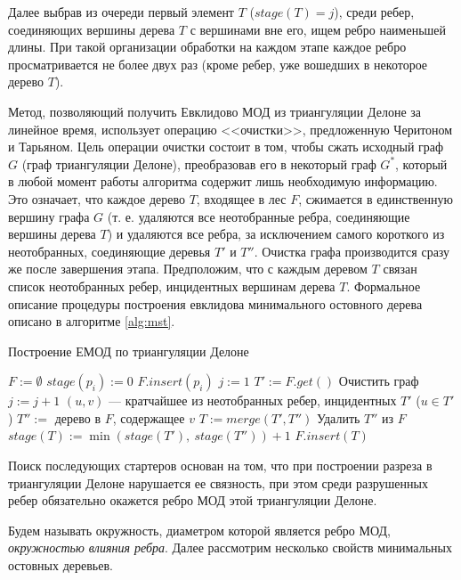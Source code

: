 \documentclass[12pt]{article}
\begin{document}
Далее выбрав из очереди первый элемент $T$ ($stage(T) = j$), среди ребер,
соединяющих вершины дерева $T$ с вершинами вне его, ищем ребро наименьшей длины.
При такой организации обработки на каждом этапе каждое ребро просматривается не более двух раз
(кроме ребер, уже вошедших в некоторое дерево $T$).

Метод, позволяющий получить Евклидово МОД из триангуляции Делоне за линейное время,
использует операцию <<очистки>>, предложенную Черитоном и Тарьяном.
Цель операции очистки состоит в том, чтобы сжать исходный граф $G$ (граф триангуляции Делоне),
преобразовав его в некоторый граф $G^*$, который в любой момент работы алгоритма содержит лишь необходимую информацию.
Это означает, что каждое дерево $T$, входящее в лес $F$, сжимается в единственную вершину графа $G$
(т. е. удаляются все неотобранные ребра, соединяющие вершины дерева $T$) и
удаляются все ребра, за исключением самого короткого из неотобранных, соединяющие деревья $T'$ и $T''$.
Очистка графа производится сразу же после завершения этапа.
Предположим, что с каждым деревом $T$ связан список неотобранных ребер, инцидентных вершинам дерева $T$.
Формальное описание процедуры построения евклидова минимального остовного дерева описано в алгоритме \ref{alg:mst}.

\begin{algorithm}[htb!]
\caption{Построение ЕМОД по триангуляции Делоне}\label{emst}
\begin{algorithmic}[1]
	\State $F := \emptyset$
		\State $stage(p_i) := 0$
		\State $F.insert(p_i)$
	\EndFor
	\State $j := 1$
		\State $T' := F.get()$
            \State Очистить граф
            \State $j := j + 1$
        \EndIf
        \State $(u, v)$ --- кратчайшее из неотобранных ребер, инцидентных $T'$ ($u \in T'$)
        \State $T'' := $ дерево в $F$, содержащее $v$
        \State $T := merge(T', T'')$
        \State Удалить $T''$ из $F$
        \State $stage(T) := \min(stage(T'),~stage(T'')) + 1$
        \State $F.insert(T)$
	\EndWhile
\EndProcedure
\end{algorithmic}
\label{alg:mst}
\end{algorithm}

Поиск последующих стартеров основан на том, что при построении разреза в триангуляции Делоне нарушается ее связность,
при этом среди разрушенных ребер обязательно окажется ребро МОД этой триангуляции Делоне.

Будем называть окружность, диаметром которой является ребро МОД, {\itshape окружностью влияния ребра}.
Далее рассмотрим несколько свойств минимальных остовных деревьев.
\end{document}
